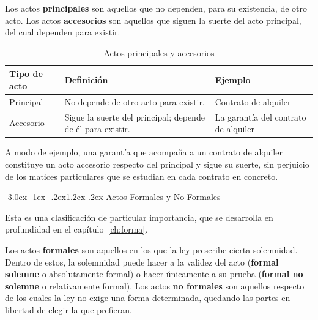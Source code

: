 \documentclass[12pt,oneside]{book}
\makeatletter
\renewcommand\section{\@startsection{section}{1}{\z@}%
  {-3.0ex \@plus -1ex \@minus -.2ex}{1.2ex \@plus .2ex}%
  {\normalfont\large\bfseries\color{acento}}}
\makeatother
\begin{document}
\begin{definicion}
Los actos \textbf{principales} son aquellos que no dependen, para su existencia, de otro acto. Los actos \textbf{accesorios} son aquellos que siguen la suerte del acto principal, del cual dependen para existir.
\end{definicion}

\begin{table}[H]
\centering
\begin{tabularx}{\textwidth}{l X X}
\toprule
\textbf{Tipo de acto} & \textbf{Definición} & \textbf{Ejemplo} \\
\midrule
Principal & No depende de otro acto para existir. & Contrato de alquiler \\
Accesorio & Sigue la suerte del principal; depende de él para existir. & La garantía del contrato de alquiler \\
\bottomrule
\end{tabularx}
\caption{Actos principales y accesorios}
\end{table}

A modo de ejemplo, una garantía que acompaña a un contrato de alquiler constituye un acto accesorio respecto del principal y sigue su suerte, sin perjuicio de los matices particulares que se estudian en cada contrato en concreto.

\section{Actos Formales y No Formales}

Esta es una clasificación de particular importancia, que se desarrolla en profundidad en el capítulo~\ref{ch:forma}.

\begin{definicion}
Los actos \textbf{formales} son aquellos en los que la ley prescribe cierta solemnidad. Dentro de estos, la solemnidad puede hacer a la validez del acto (\textbf{formal solemne} o absolutamente formal) o hacer únicamente a su prueba (\textbf{formal no solemne} o relativamente formal). Los actos \textbf{no formales} son aquellos respecto de los cuales la ley no exige una forma determinada, quedando las partes en libertad de elegir la que prefieran.
\end{definicion}
\end{document}
